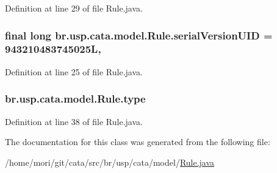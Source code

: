 Definition at line 29 of file Rule.\+java.

\hypertarget{classbr_1_1usp_1_1cata_1_1model_1_1_rule_a1c11fae4633358130f0250111ffe75da}{
\subsubsection[{serial\+Version\+U\+I\+D}]{\setlength{\rightskip}{0pt plus 5cm}final long br.\+usp.\+cata.\+model.\+Rule.\+serial\+Version\+U\+I\+D = 943210483745025\+L\hspace{0.3cm}{\ttfamily [static]}, {\ttfamily [private]}}}\label{classbr_1_1usp_1_1cata_1_1model_1_1_rule_a1c11fae4633358130f0250111ffe75da}


Definition at line 25 of file Rule.\+java.

\hypertarget{classbr_1_1usp_1_1cata_1_1model_1_1_rule_a1a315aef4010c0013e98cca88b17477a}{
\subsubsection[{type}]{ br.\+usp.\+cata.\+model.\+Rule.\+type\hspace{0.3cm}{\ttfamily [private]}}}\label{classbr_1_1usp_1_1cata_1_1model_1_1_rule_a1a315aef4010c0013e98cca88b17477a}


Definition at line 38 of file Rule.\+java.



The documentation for this class was generated from the following file\+:\begin{DoxyCompactItemize}
\item 
/home/mori/git/cata/src/br/usp/cata/model/\hyperlink{_rule_8java}{Rule.\+java}\end{DoxyCompactItemize}
